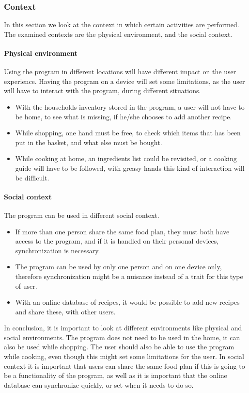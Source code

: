 \subsubsection{Context}
In this section we look at the context in which certain activities are performed. The examined contexts are the physical environment, and the social context.

\paragraph{Physical environment}
Using the program in different locations will have different impact on the user experience. Having the program on a device will set some limitations, as the user will have to interact with the program, during different situations.
\begin{itemize}
\item With the households inventory stored in the program, a user will not have to be home, to see what is missing, if he/she chooses to add another recipe.
\item While shopping, one hand must be free, to check which items that has been put in the basket, and what else must be bought.
\item While cooking at home, an ingredients list could be revisited, or a cooking guide will have to be followed, with greasy hands this kind of interaction will be difficult.
\end{itemize}

\paragraph{Social context}
The program can be used in different social context.
\begin{itemize}
\item If more than one person share the same food plan, they must both have access to the program, and if it is handled on their personal devices, synchronization is necessary.
\item The program can be used by only one person and on one device only, therefore synchronization might be a nuisance instead of a trait for this type of user.
\item With an online database of recipes, it would be possible to add new recipes and share these, with other users.
\end{itemize}

In conclusion, it is important to look at different environments like physical and social environments. The program does not need to be used in the home, it can also be used while shopping. The user should also be able to use the program while cooking, even though this might set some limitations for the user. In social context it is important that users can share the same food plan if this is going to be a functionality of the program, as well as it is important that the online database can synchronize quickly, or set when it needs to do so.